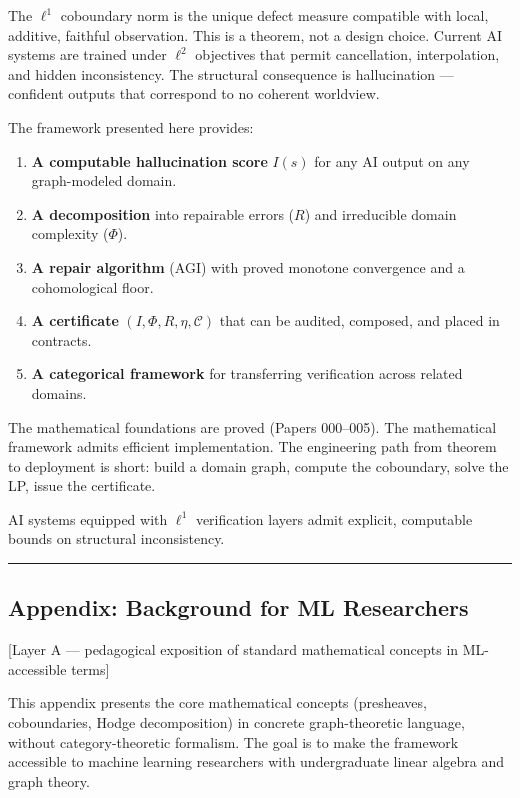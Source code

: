 \documentclass[
]{article}
\providecommand{\tightlist}{%
  \setlength{\itemsep}{0pt}\setlength{\parskip}{0pt}}
\begin{document}
The \(\ell^1\) coboundary norm is the unique defect measure compatible
with local, additive, faithful observation. This is a theorem, not a
design choice. Current AI systems are trained under \(\ell^2\)
objectives that permit cancellation, interpolation, and hidden
inconsistency. The structural consequence is hallucination --- confident
outputs that correspond to no coherent worldview.

The framework presented here provides:

\begin{enumerate}
\def\labelenumi{\arabic{enumi}.}
\tightlist
\item
  \textbf{A computable hallucination score} \(I(s)\) for any AI output
  on any graph-modeled domain.
\item
  \textbf{A decomposition} into repairable errors (\(R\)) and
  irreducible domain complexity (\(\Phi\)).
\item
  \textbf{A repair algorithm} (AGI) with proved monotone convergence and
  a cohomological floor.
\item
  \textbf{A certificate} \((I, \Phi, R, \eta, \mathcal{C})\) that can be
  audited, composed, and placed in contracts.
\item
  \textbf{A categorical framework} for transferring verification across
  related domains.
\end{enumerate}

The mathematical foundations are proved (Papers 000--005). The
mathematical framework admits efficient implementation. The engineering
path from theorem to deployment is short: build a domain graph, compute
the coboundary, solve the LP, issue the certificate.

AI systems equipped with \(\ell^1\) verification layers admit explicit,
computable bounds on structural inconsistency.

\begin{center}\rule{0.5\linewidth}{0.5pt}\end{center}

\subsection{Appendix: Background for ML
Researchers}\label{appendix-background-for-ml-researchers}

{[}Layer A --- pedagogical exposition of standard mathematical concepts
in ML-accessible terms{]}

This appendix presents the core mathematical concepts (presheaves,
coboundaries, Hodge decomposition) in concrete graph-theoretic language,
without category-theoretic formalism. The goal is to make the framework
accessible to machine learning researchers with undergraduate linear
algebra and graph theory.
\end{document}
